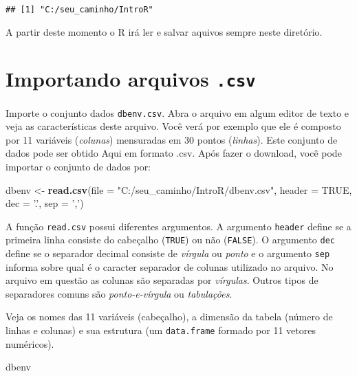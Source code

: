 \documentclass[
]{book}
\newenvironment{Shaded}{\begin{snugshade}}{\end{snugshade}}
\newcommand{\DataTypeTok}[1]{\textcolor[rgb]{0.13,0.29,0.53}{#1}}
\newcommand{\KeywordTok}[1]{\textcolor[rgb]{0.13,0.29,0.53}{\textbf{#1}}}
\newcommand{\NormalTok}[1]{#1}
\newcommand{\OtherTok}[1]{\textcolor[rgb]{0.56,0.35,0.01}{#1}}
\newcommand{\StringTok}[1]{\textcolor[rgb]{0.31,0.60,0.02}{#1}}
\begin{document}
\begin{verbatim}
## [1] "C:/seu_caminho/IntroR"
\end{verbatim}

A partir deste momento o R irá ler e salvar aquivos sempre neste diretório.

\hypertarget{importando-arquivos-.csv}{%
\section{\texorpdfstring{Importando arquivos \texttt{.csv}}{Importando arquivos .csv}}\label{importando-arquivos-.csv}}

Importe o conjunto dados \texttt{dbenv.csv}. Abra o arquivo em algum editor de texto e veja as características deste arquivo. Você verá por exemplo que ele é composto por 11 variáveis (\emph{colunas}) mensuradas em 30 pontos (\emph{linhas}). Este conjunto de dados pode ser obtido Aqui em formato .csv. Após fazer o download, você pode importar o conjunto de dados por:

\begin{Shaded}
\begin{Highlighting}[]
\NormalTok{dbenv <-}\StringTok{ }\KeywordTok{read.csv}\NormalTok{(}\DataTypeTok{file =} \StringTok{"C:/seu_caminho/IntroR/dbenv.csv"}\NormalTok{, }
                 \DataTypeTok{header =} \OtherTok{TRUE}\NormalTok{, }\DataTypeTok{dec =} \StringTok{'.'}\NormalTok{, }\DataTypeTok{sep =} \StringTok{','}\NormalTok{)}
\end{Highlighting}
\end{Shaded}

A função \texttt{read.csv} possui diferentes argumentos. A argumento \texttt{header} define se a primeira linha consiste do cabeçalho (\texttt{TRUE}) ou não (\texttt{FALSE}). O argumento \texttt{dec} define se o separador decimal consiste de \emph{vírgula} ou \emph{ponto} e o argumento \texttt{sep} informa sobre qual é o caracter separador de colunas utilizado no arquivo. No arquivo em questão as colunas são separadas por \emph{vírgulas}. Outros tipos de separadores comuns são \emph{ponto-e-vírgula} ou \emph{tabulações}.

Veja os nomes das 11 variáveis (cabeçalho), a dimensão da tabela (número de linhas e colunas) e sua estrutura (um \texttt{data.frame} formado por 11 vetores numéricos).

\begin{Shaded}
\begin{Highlighting}[]
\NormalTok{dbenv}
\end{Highlighting}
\end{Shaded}
\end{document}

